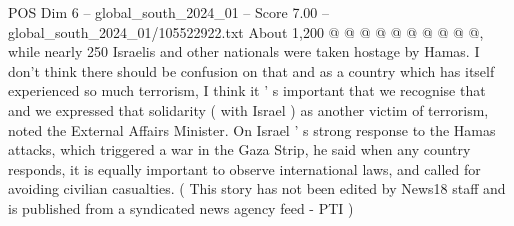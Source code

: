 \begin{textsample}{POS Dim 6 – global\_south\_2024\_01 – Score 7.00 – global\_south\_2024\_01/105522922.txt}
About 1,200 @ @ @ @ @ @ @ @ @ @, while nearly 250 Israelis and other nationals were taken hostage by Hamas.
I don't think there should be confusion on that and as a country which has itself experienced so much terrorism, I think it ' s important that we recognise that and we expressed that solidarity ( with Israel ) as another victim of terrorism, noted the External Affairs Minister.
On Israel ' s strong response to the Hamas attacks, which triggered a war in the Gaza Strip, he said when any country responds, it is equally important to observe international laws, and called for avoiding civilian casualties. ( This story has not been edited by News18 staff and is published from a syndicated news agency feed - PTI )

\end{textsample}
